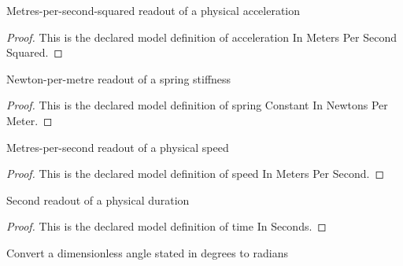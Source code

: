 \begin{definition}
  \label{def:physics:phyx-mini-0257:phyxminiproblems-problemphyxmini0257-accelerationinmeterspersecondsquared}
  Metres-per-second-squared readout of a physical acceleration
\end{definition}
\begin{proof}
  This is the declared model definition of acceleration In Meters Per Second Squared.
\end{proof}
\begin{definition}
  \label{def:physics:phyx-mini-0257:phyxminiproblems-problemphyxmini0257-springconstantinnewtonspermeter}
  Newton-per-metre readout of a spring stiffness
\end{definition}
\begin{proof}
  This is the declared model definition of spring Constant In Newtons Per Meter.
\end{proof}
\begin{definition}
  \label{def:physics:phyx-mini-0257:phyxminiproblems-problemphyxmini0257-speedinmeterspersecond}
  Metres-per-second readout of a physical speed
\end{definition}
\begin{proof}
  This is the declared model definition of speed In Meters Per Second.
\end{proof}
\begin{definition}
  \label{def:physics:phyx-mini-0257:phyxminiproblems-problemphyxmini0257-timeinseconds}
  Second readout of a physical duration
\end{definition}
\begin{proof}
  This is the declared model definition of time In Seconds.
\end{proof}
\begin{definition}
  \label{def:physics:phyx-mini-0257:phyxminiproblems-problemphyxmini0257-degreestoradians}
  Convert a dimensionless angle stated in degrees to radians
\end{definition}
